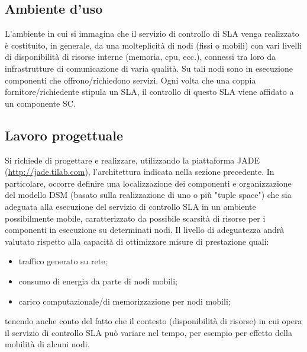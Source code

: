 \subsection{Ambiente d'uso}
L’ambiente in cui si immagina che il servizio di controllo di SLA venga realizzato è costituito, in generale, da una molteplicità di nodi (fissi o mobili) con vari livelli di disponibilità di risorse interne (memoria, cpu, ecc.), connessi tra loro da infrastrutture di comunicazione di varia qualità. Su tali nodi sono in esecuzione componenti che offrono/richiedono servizi. Ogni volta che una coppia fornitore/richiedente stipula un SLA, il controllo di questo SLA viene affidato a un componente SC.
\subsection{Lavoro progettuale}
Si richiede di progettare e realizzare, utilizzando la piattaforma JADE (\url{http://jade.tilab.com}), l’architettura indicata nella sezione precedente. In particolare, occorre definire una localizzazione dei componenti e organizzazione del modello DSM (basato sulla realizzazione di uno o più "tuple space") che sia adeguata alla esecuzione del servizio di controllo SLA in un ambiente possibilmente mobile, caratterizzato da possibile scarsità di risorse per i componenti in esecuzione su determinati nodi. Il livello di adeguatezza andrà valutato rispetto alla capacità di ottimizzare misure di prestazione quali:
\begin{itemize}
\item traffico generato su rete;
\item consumo di energia da parte di nodi mobili;
\item carico computazionale/di memorizzazione per nodi mobili;
\end{itemize}
tenendo anche conto del fatto che il contesto (disponibilità di risorse) in cui opera il servizio di controllo SLA può variare nel tempo, per esempio per effetto della mobilità di alcuni nodi.
